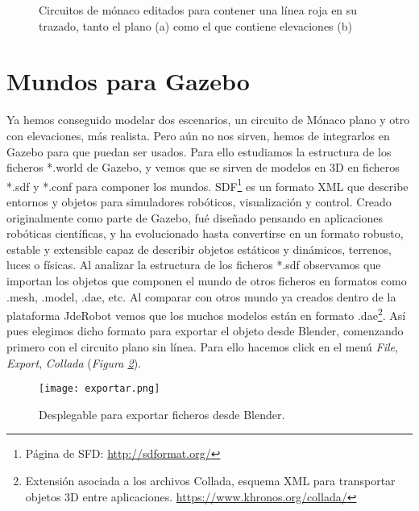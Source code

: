 \begin{figure}[]
	\centering
	\hspace{0.03\textwidth}
	\caption[Circuitos con una línea roja]{Circuitos de mónaco editados para contener una línea roja en su trazado, tanto el plano (a) como el que contiene elevaciones (b)} \label{fig:monacolinea}
\end{figure}

\section{Mundos para Gazebo}
\label{sec:pm_mundosparagazebo}

Ya hemos conseguido modelar dos escenarios, un circuito de Mónaco plano y otro con elevaciones, más realista. Pero aún no nos sirven, hemos de integrarlos en Gazebo para que puedan ser usados. Para ello estudiamos la estructura de los ficheros *.world de Gazebo, y vemos que se sirven de modelos en 3D en ficheros *.sdf y *.conf para componer los mundos. SDF\footnote{Página de SFD: \url{http://sdformat.org/}} es un formato XML que describe entornos y objetos para simuladores robóticos, visualización y control. Creado originalmente como parte de Gazebo, fué diseñado pensando en aplicaciones robóticas científicas, y ha evolucionado hasta convertirse en un formato robusto, estable y extensible capaz de describir objetos estáticos y dinámicos, terrenos, luces o físicas. 
Al analizar la estructura de los ficheros *.sdf observamos que importan los objetos que componen el mundo de otros ficheros en formatos como .mesh, .model, .dae, etc. Al comparar con otros mundo ya creados dentro de la plataforma JdeRobot vemos que los muchos modelos están en formato .dae\footnote{Extensión asociada a los archivos Collada, esquema XML para transportar objetos 3D entre aplicaciones. \url{https://www.khronos.org/collada/}}. Así pues elegimos dicho formato para exportar el objeto desde Blender, comenzando primero con el circuito plano sin línea. Para ello hacemos click en el menú \textit{File}, \textit{Export}, \textit{Collada} (\textit{Figura \ref{fig:exportar}}).

\begin{figure}[h]
	\centering
	\texttt{[image: exportar.png]}
	\caption{Desplegable para exportar ficheros desde Blender.} \label{fig:exportar}
\end{figure}

